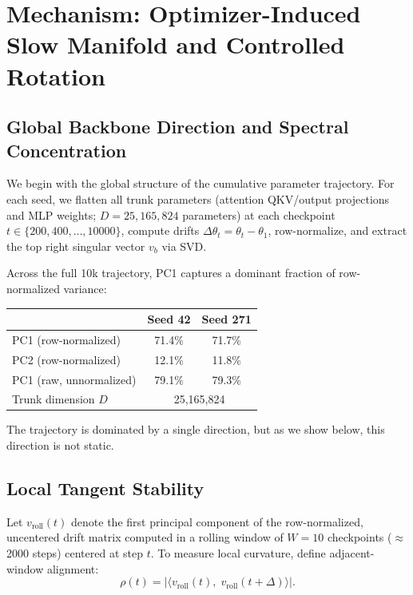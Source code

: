 \documentclass[11pt,a4paper]{article}
\begin{document}
\section{Mechanism: Optimizer-Induced Slow Manifold and Controlled Rotation}\label{sec:mechanism}

\subsection{Global Backbone Direction and Spectral Concentration}

We begin with the global structure of the cumulative parameter trajectory. For each seed, we flatten all trunk parameters (attention QKV/output projections and MLP weights; $D = 25{,}165{,}824$ parameters) at each checkpoint $t \in \{200, 400, \ldots, 10000\}$, compute drifts $\Delta\theta_t = \theta_t - \theta_1$, row-normalize, and extract the top right singular vector $v_b$ via SVD.

Across the full 10k trajectory, PC1 captures a dominant fraction of row-normalized variance:

\begin{center}
\begin{tabular}{lcc}
\toprule
 & Seed 42 & Seed 271 \\
\midrule
PC1 (row-normalized) & 71.4\% & 71.7\% \\
PC2 (row-normalized) & 12.1\% & 11.8\% \\
PC1 (raw, unnormalized) & 79.1\% & 79.3\% \\
Trunk dimension $D$ & \multicolumn{2}{c}{25,165,824} \\
\bottomrule
\end{tabular}
\end{center}

The trajectory is dominated by a single direction, but as we show below, this direction is not static.


\subsection{Local Tangent Stability}

Let $v_{\mathrm{roll}}(t)$ denote the first principal component of the row-normalized, uncentered drift matrix computed in a rolling window of $W = 10$ checkpoints ($\approx$2000 steps) centered at step $t$. To measure local curvature, define adjacent-window alignment:
%
\[
\rho(t) = \bigl|\langle v_{\mathrm{roll}}(t),\; v_{\mathrm{roll}}(t+\Delta) \rangle\bigr|.
\]
\end{document}
